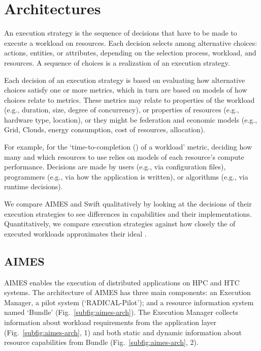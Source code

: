 \documentclass[10pt, conference, compsocconf]{IEEEtran}
\begin{document}
\section{Architectures}\label{sec:archs}

An execution strategy is the sequence of decisions that have to be made to
execute a workload on resources. Each decision selects among alternative
choices: actions, entities, or attributes, depending on the selection
process, workload, and resources. A sequence of choices is a realization of
an execution strategy.

Each decision of an execution strategy is based on evaluating how alternative
choices satisfy one or more metrics, which in turn are based on models of how
choices relate to metrics. These metrics may relate to properties of the
workload (e.g., duration, size, degree of concurrency), or properties of
resources (e.g., hardware type, location), or they might be federation and
economic models (e.g., Grid, Clouds, energy consumption, cost of resources,
allocation).

For example, for the `time-to-completion () of a workload' metric,
deciding how many and which resources to use relies on models of each
resource's compute performance. Decisions are made by users (e.g., via
configuration files), programmers (e.g., via how the application is written),
or algorithms (e.g., via runtime decisions).

We compare AIMES and Swift qualitatively by looking at the decisions of their
execution strategies to see differences in capabilities and their
implementations. Quantitatively, we compare execution strategies against how
closely the  of executed workloads approximates their ideal .

\subsection{AIMES}\label{sub:archs-aimes}

AIMES enables the execution of distributed applications on HPC and HTC systems.
The architecture of AIMES has three main components: an Execution Manager, a
pilot system (`RADICAL-Pilot'); and a resource information system named `Bundle'
(Fig.~\ref{subfig:aimes-arch}). The Execution Manager collects information about
workload requirements from the application layer (Fig.~\ref{subfig:aimes-arch},
1) and both static and dynamic information about resource capabilities from
Bundle (Fig.~\ref{subfig:aimes-arch}, 2).
\end{document}
